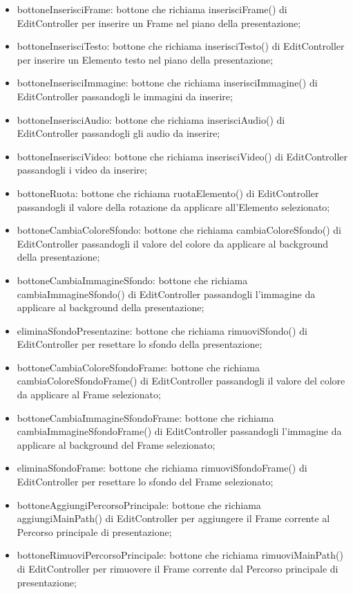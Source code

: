 {{\begin{itemize}
		\item bottoneInserisciFrame: bottone che richiama inserisciFrame() di EditController per inserire un Frame nel piano della presentazione;
		\item bottoneInserisciTesto: bottone che richiama inserisciTesto() di EditController per inserire un Elemento testo nel piano della presentazione;
		\item bottoneInserisciImmagine: bottone che richiama inserisciImmagine() di EditController passandogli le immagini da inserire;
		\item bottoneInserisciAudio: bottone che richiama inserisciAudio() di EditController passandogli gli audio da inserire;
		\item bottoneInserisciVideo: bottone che richiama inserisciVideo() di EditController passandogli i video da inserire;
		\item bottoneRuota: bottone che richiama ruotaElemento() di EditController passandogli il valore della rotazione da applicare all'Elemento selezionato;
		\item bottoneCambiaColoreSfondo: bottone che richiama cambiaColoreSfondo() di EditController passandogli il valore del colore da applicare al background della presentazione;
		\item bottoneCambiaImmagineSfondo: bottone che richiama cambiaImmagineSfondo() di EditController passandogli l'immagine da applicare al background della presentazione;
		\item eliminaSfondoPresentazine: bottone che richiama rimuoviSfondo() di EditController per resettare lo sfondo della presentazione;
		\item bottoneCambiaColoreSfondoFrame: bottone che richiama cambiaColoreSfondoFrame() di EditController passandogli il valore del colore da applicare al Frame selezionato;
		\item bottoneCambiaImmagineSfondoFrame: bottone che richiama cambiaImmagineSfondoFrame() di EditController passandogli l'immagine da applicare al background del Frame selezionato;
		\item eliminaSfondoFrame: bottone che richiama rimuoviSfondoFrame() di EditController per resettare lo sfondo del Frame selezionato;
		\item bottoneAggiungiPercorsoPrincipale: bottone che richiama aggiungiMainPath() di EditController per aggiungere il Frame corrente al Percorso principale di presentazione;
		\item bottoneRimuoviPercorsoPrincipale: bottone che richiama rimuoviMainPath() di EditController per rimuovere il Frame corrente dal Percorso principale di presentazione;

\end{itemize}}}
